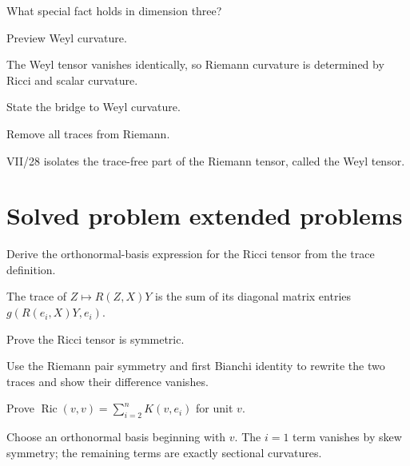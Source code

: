 \begin{exercise}\label{exr:vii27-23}
What special fact holds in dimension three?
\end{exercise}
\begin{hint}
Preview Weyl curvature.
\end{hint}
\begin{solution}
The Weyl tensor vanishes identically, so Riemann curvature is determined by Ricci and scalar curvature.
\end{solution}

\begin{exercise}\label{exr:vii27-24}
State the bridge to Weyl curvature.
\end{exercise}
\begin{hint}
Remove all traces from Riemann.
\end{hint}
\begin{solution}
VII/28 isolates the trace-free part of the Riemann tensor, called the Weyl tensor.
\end{solution}

\section{Solved problem extended problems}
\begin{problem}\label{prob:vii27-01}
Derive the orthonormal-basis expression for the Ricci tensor from the trace definition.
\end{problem}
\begin{solution}
The trace of \(Z\mapsto R(Z,X)Y\) is the sum of its diagonal matrix entries \(g(R(e_i,X)Y,e_i)\).
\end{solution}

\begin{problem}\label{prob:vii27-02}
Prove the Ricci tensor is symmetric.
\end{problem}
\begin{solution}
Use the Riemann pair symmetry and first Bianchi identity to rewrite the two traces and show their difference vanishes.
\end{solution}

\begin{problem}\label{prob:vii27-03}
Prove \(\operatorname{Ric}(v,v)=\sum_{i=2}^nK(v,e_i)\) for unit \(v\).
\end{problem}
\begin{solution}
Choose an orthonormal basis beginning with \(v\). The \(i=1\) term vanishes by skew symmetry; the remaining terms are exactly sectional curvatures.
\end{solution}

